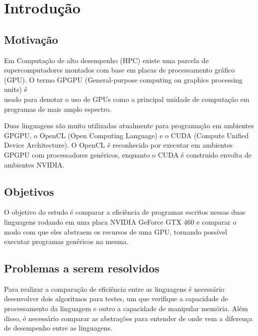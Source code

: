 \section{Introdução}
\subsection{Motivação}
Em Computação de alto desempenho (HPC) existe uma parcela de supercomputadores montados com base em placas
de processamento gráfico (GPU). O termo GPGPU (General-purpose computing on graphics processing units) é
\\usado para denotar o uso de GPUs como a principal unidade de computação em programas de mais amplo espectro.

Duas linguagens são muito utilizadas atualmente para programação em ambientes GPGPU, o OpenCL (Open Computing Language) 
e o CUDA (Compute Unified Device Architecture). O OpenCL é reconhecido por executar em ambientes GPGPU com processadores genéricos, 
enquanto o CUDA é construido envolta de ambientes NVIDIA.

\subsection{Objetivos}
O objetivo do estudo é comparar a eficiência de programas escritos nessas duas linguagens rodando em uma placa NVIDIA GeForce GTX 460
e comparar o modo com que eles abstraem os recursos de uma GPU, tornando possível executar programas genéricos na mesma.

\subsection{Problemas a serem resolvidos}
Para realizar a comparação de eficiência entre as linguagens é necessário desenvolver dois algoritmos para testes, um que verifique
a capacidade de processamento da linguagem e outro a capacidade de manipular memória. Além disso, é necessário comparar as abstrações
para entender de onde vem a diferença de desempenho entre as linguagens.
